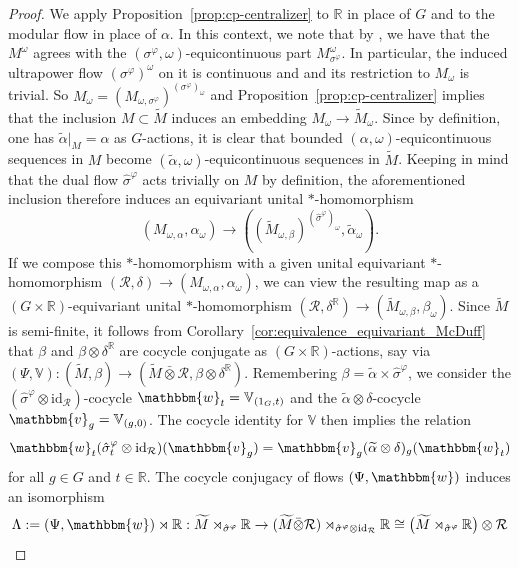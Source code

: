 \documentclass[11pt,a4paper]{article}
\theoremstyle{definition}
\theoremstyle{remark}
\numberwithin{equation}{section}
\numberwithin{theorem}{section}
\renewcommand{\tilde}{\widetilde}
\begin{document}
\begin{proof}
We apply Proposition~\ref{prop:cp-centralizer} to $\mathbb{R}$ in place of $G$ and to the modular flow in place of $\alpha$.
In this context, we note that by \cite[Theorem 4.1, Proposition 4.11]{AndoHaagerup14}, we have that the $M^\omega$ agrees with the $(\sigma^\varphi,\omega)$-equicontinuous part $M^\omega_{\sigma^\varphi}$.
In particular, the induced ultrapower flow $(\sigma^\varphi)^\omega$ on it is continuous and and its restriction to $M_\omega$ is trivial.
So $M_\omega=(M_{\omega,\sigma^\varphi})^{(\sigma^\varphi)_\omega}$ and Proposition~\ref{prop:cp-centralizer} implies that the inclusion $M\subset\tilde{M}$ induces an embedding $M_\omega\to \tilde{M}_\omega$.
Since by definition, one has $\tilde{\alpha}|_M=\alpha$ as $G$-actions, it is clear that bounded $(\alpha,\omega)$-equicontinuous sequences in $M$ become $(\tilde{\alpha},\omega)$-equicontinuous sequences in $\tilde{M}$.
Keeping in mind that the dual flow $\hat{\sigma}^\varphi$ acts trivially on $M$ by definition, the aforementioned inclusion therefore induces an equivariant unital $*$-homomorphism
\[
(M_{\omega,\alpha},\alpha_\omega) \to ( (\tilde{M}_{\omega,\beta})^{(\hat{\sigma}^\varphi)_\omega},\tilde{\alpha}_\omega ).
\]
If we compose this $*$-homomorphism with a given unital equivariant $*$-homomorphism $(\mathcal R,\delta)\to (M_{\omega,\alpha},\alpha_\omega)$, we can view the resulting map as a $(G\times\mathbb{R})$-equivariant unital $*$-homomorphism $(\mathcal R,\delta^{\mathbb R}) \to (\tilde{M}_{\omega,\beta},\beta_\omega)$.
Since $\tilde{M}$ is semi-finite, it follows from Corollary~\ref{cor:equivalence_equivariant_McDuff} that $\beta$ and $\beta\otimes\delta^{\mathbb R}$ are cocycle conjugate as $(G\times\mathbb R)$-actions, say via $(\Psi,\mathbb{V}): (\tilde{M},\beta)\to (\tilde{M}\bar{\otimes}\mathcal{R},\beta\otimes\delta^{\mathbb R})$.
%
Remembering $\beta=\tilde{\alpha}\times\hat{\sigma}^\varphi$, we consider the $(\hat{\sigma}^\varphi\otimes \mathrm{id}_\mathcal{R})$-cocycle $\mathbbm{w}_t=\mathbb{V}_{(1_G,t)}$ and the $\tilde{\alpha}\otimes \delta$-cocycle $\mathbbm{v}_g=\mathbb{V}_{(g,0)}$.
The cocycle identity for $\mathbb{V}$ then implies the relation 
\begin{equation} \label{eq:cocycle-interaction}
\mathbbm{w}_t(\hat{\sigma}^\varphi_t\otimes\operatorname{id}_{\mathcal R})(\mathbbm{v}_g)=\mathbbm{v}_g(\tilde{\alpha}\otimes\delta)_g(\mathbbm{w}_t)
\end{equation}
for all $g\in G$ and $t\in\mathbb R$.
The cocycle conjugacy of flows $(\Psi,\mathbbm{w})$ induces an isomorphism
\[
\Lambda:=(\Psi,\mathbbm{w})\rtimes\mathbb R: \tilde{M}\rtimes_{\hat{\sigma}^\varphi}\mathbb R \to (\tilde{M}\bar{\otimes}\mathcal R)\rtimes_{\hat{\sigma}^\varphi\otimes\operatorname{id}_{\mathcal R}}\mathbb R \cong \big(\tilde{M}\rtimes_{\hat{\sigma}^\varphi}\mathbb R\big)\otimes\mathcal R
\]
\end{proof}
\end{document}
